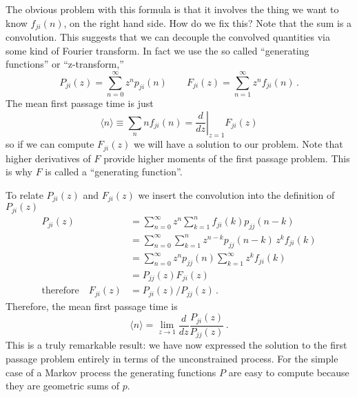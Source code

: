 \documentclass{article}
\begin{document}
The obvious problem with this formula is that it involves the thing we want to know $f_{ji}(n)$, on the right hand side.
How do we fix this? Note that the sum is a convolution.
This suggests that we can decouple the convolved quantities via some kind of Fourier transform.
In fact we use the so called ``generating functions'' or ``z-transform,''
\begin{equation}
P_{ji}(z)=\sum_{n=0}^{\infty}z^{n}p_{ji}(n)\qquad F_{ji}(z)=\sum_{n=1}^{\infty}z^{n}f_{ji}(n) \, .
\end{equation}
The mean first passage time is just
\begin{equation}
\langle n \rangle \equiv \sum_n n f_{ji}(n) = \left. \frac{d}{dz}\right|_{z=1}F_{ji}(z)
\end{equation}
so if we can compute $F_{ji}(z)$ we will have a solution to our problem.
Note that higher derivatives of $F$ provide higher moments of the first passage problem.
This is why $F$ is called a ``generating function''.

To relate $P_{ji}(z)$ and $F_{ji}(z)$ we insert the convolution into the definition of $P_{ji}(z)$
\begin{align*}
P_{ji}(z)
& = \sum_{n=0}^{\infty}z^{n}\sum_{k=1}^{n}f_{ji}(k)p_{jj}(n-k)\\
& = \sum_{n=0}^{\infty}\sum_{k=1}^{n}z^{n-k}p_{jj}(n-k)\, z^{k}f_{ji}(k)\\
& = \sum_{n=0}^{\infty}z^{n}p_{jj}(n)\sum_{k=1}^{\infty}z^{k}f_{ji}(k)\\
& = P_{jj}(z)F_{ji}(z)\\
\textrm{therefore}\quad F_{ji}(z) & = P_{ji}(z)/P_{jj}(z) \, .
\end{align*}
Therefore, the mean first passage time is
\begin{equation}
\langle n \rangle = \lim_{z \rightarrow 1} \frac{d}{dz} \frac{P_{ji}(z)}{P_{jj}(z)} \, .
\end{equation}
This is a truly remarkable result: we have now expressed the solution to the first passage problem entirely in terms of the unconstrained process.
For the simple case of a Markov process the generating functions $P$ are easy to compute because they are geometric sums of $p$.
\end{document}

